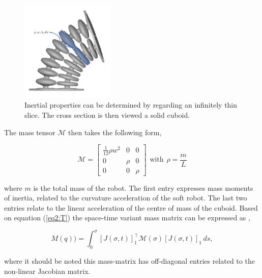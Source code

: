 {\begin{figure}[H]
    \centering
    \includegraphics[width = 0.4\textwidth]{Figures/Chapter2/massapprox.png}
    \caption{Inertial properties can be determined by regarding an infinitely thin slice. The cross section is then viewed a solid cuboid.}
    \label{fig:massapprox}
\end{figure}


The mass tensor $\mathcal{M}$ then takes the following form,

\begin{equation}
    \mathcal{M} = \begin{bmatrix} \frac{1}{12}\rho w^2 & 0 & 0 \\
                                   0 & \rho & 0 \\
                                   0 & 0 & \rho \end{bmatrix}\hspace{5pt} \text{with} \hspace{5pt} \rho = \frac{m}{L}
\end{equation} 




where $m$ is the total mass of the robot. The first entry expresses mass moments of inertia, related to the curvature acceleration of the soft robot. The last two entries relate to the linear acceleration of the centre of mass of the cuboid. Based on equation (\ref{eq2:T}) the space-time variant mass matrix can be expressed as  \cite{Caasenbrood2020}, 


\begin{equation}
    M(q)) = \int_0^{\sigma} [J(\sigma,t)]_1^\top \mathcal{M}(\sigma)[J(\sigma,t)]_1  \hspace{2pt}ds,
\end{equation}

where it should be noted this mass-matrix has off-diagonal entries related to the non-linear Jacobian matrix. 

}
